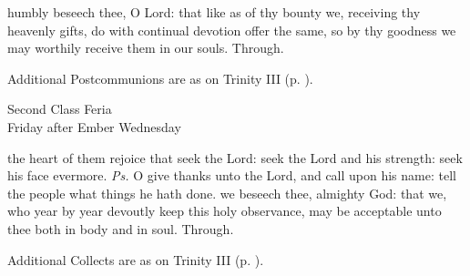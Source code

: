 
\postcommunion
{} humbly beseech thee, O Lord: that like as of thy bounty we, receiving thy heavenly gifts, do with continual devotion offer the same, so by thy goodness we may worthily receive them in our souls. Through.
\begin{rubric}
    Additional Postcommunions are as on Trinity III (p. \pageref{TrinityIII}).
\end{rubric}

\begin{inhead}
    {Second Class Feria\\
Friday after Ember Wednesday}
\end{inhead}
\par\noindent
{}
\introit
{} the heart of them rejoice that seek the Lord: seek the Lord and his strength: seek his face evermore. \textit{Ps.} O give thanks unto the Lord, and call upon his name: tell the people what things he hath done.
\collect
{} we beseech thee, almighty God: that we, who year by year devoutly keep this holy observance, may be acceptable unto thee both in body and in soul. Through.
\begin{rubric}
    Additional Collects are as on Trinity III (p. \pageref{TrinityIII}).
\end{rubric}

